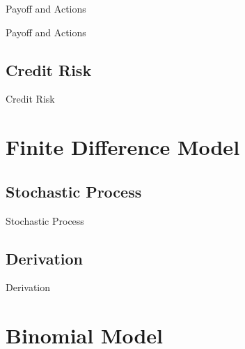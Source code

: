\documentclass{beamer}
\begin{document}
\begin{frame}{Payoff and Actions}

\end{frame}

\begin{frame}{Payoff and Actions}

\end{frame}



\subsection{Credit Risk}

\begin{frame}{Credit Risk}

\end{frame}


\section{Finite Difference Model}


\subsection{Stochastic Process}

\begin{frame}{Stochastic Process}

\end{frame}


\subsection{Derivation}

\begin{frame}{Derivation}

\end{frame}


\section{Binomial Model}
\end{document}
